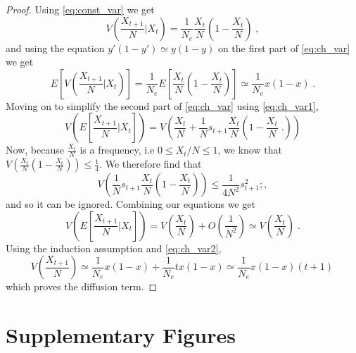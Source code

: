 \documentclass[12pt]{extarticle}
\newcommand{\beginsupplement}{%
      	\setcounter{table}{0}
        \renewcommand{\thetable}{S\arabic{table}}%
        \setcounter{figure}{0}
        \renewcommand{\thefigure}{S\arabic{figure}}%
		\setcounter{equation}{0}
        \renewcommand{\theequation}{A\arabic{equation}}%
}
\begin{document}
\begin{appendices}
\begin{proof}
Using \cref{eq:const_var} we get
\begin{equation}
V\left(\frac{X_{t+1}}{N} \bigg|X_t \right) 
= \frac{1}{N_e}\frac{X_t}{N}\left(1-\frac{X_t}{N} \right) \;,
\end{equation}
and using the equation $y'(1-y') \simeq y(1-y)$ on the first part of \cref{eq:ch_var} we get
\begin{equation}\label{eq:ch_var2}
E\left[V\left(\frac{X_{t+1}}{N} \bigg|X_t \right)\right] 
= \frac{1}{N_e}E\left[\frac{X_t}{N}\left(1- \frac{X_t}{N}\right) \right] \simeq \frac{1}{N_e} x(1-x) \;.
\end{equation}
Moving on to simplify the second part of \cref{eq:ch_var} using \cref{eq:ch_var1},
\begin{equation}
V\left(E\left[\frac{X_{t+1}}{N} \bigg|X_t \right]\right) 
= V\left(\frac{X_t}{N} + \frac{1}{N}s_{t+1}\frac{X_t}{N}\left(1-\frac{X_t}{N} \;.\right) \right)
\end{equation}
Now, because $\frac{X_t}{N}$ is a frequency, i.e $0 \leq X_t/N \leq 1$, we know that $V\left(\frac{X_t}{N}\left(1-\frac{X_t}{N} \right) \right)\leq\frac{1}{4}$. We therefore find that
\begin{equation}
V\left(\frac{1}{N}s_{t+1}\frac{X_t}{N}\left(1-\frac{X_t}{N} \right) \right)
\leq \frac{1}{4N^2}s^2_{t+1} ;,
\end{equation}
and so it can be ignored.
Combining our equations we get
\begin{equation}
V\left(E\left[\frac{X_{t+1}}{N} \bigg|X_t \right]\right) 
= V\left(\frac{X_t}{N}\right) + O\left(\frac{1}{N^2}\right)\simeq V\left(\frac{X_t}{N}\right) \;.
\end{equation}
Using the induction assumption and \cref{eq:ch_var2},
\begin{equation}
V\left(\frac{X_{t+1}}{N}\right) 
\simeq \frac{1}{N_e}x(1-x) + \frac{1}{N_e}tx(1-x) \simeq \frac{1}{N_e}x(1-x)(t+1) \,
\end{equation}
which proves the diffusion term.
\end{proof}
\end{appendices}


\newpage
\section*{Supplementary Figures}
\beginsupplement %
\end{document}
